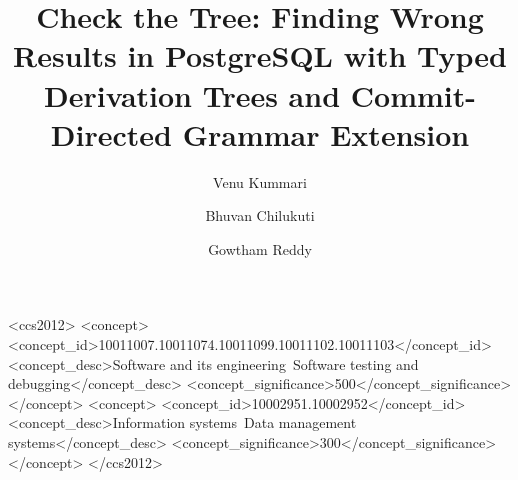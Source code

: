 \documentclass[sigconf,screen]{acmart}
\begin{document}
\title[Check the Tree]{Check the Tree: Finding Wrong Results in PostgreSQL with Typed Derivation Trees and Commit-Directed Grammar Extension}

\author{Venu Kummari}
\author{Bhuvan Chilukuti}
\author{Gowtham Reddy}
\renewcommand{\shortauthors}{Kummari, Chilukuti, and Reddy}

\begin{abstract}

\end{abstract}

\begin{CCSXML}
<ccs2012>
  <concept>
    <concept_id>10011007.10011074.10011099.10011102.10011103</concept_id>
    <concept_desc>Software and its engineering~Software testing and debugging</concept_desc>
    <concept_significance>500</concept_significance>
  </concept>
  <concept>
    <concept_id>10002951.10002952</concept_id>
    <concept_desc>Information systems~Data management systems</concept_desc>
    <concept_significance>300</concept_significance>
  </concept>
</ccs2012>
\end{CCSXML}


\maketitle
















\end{document}
